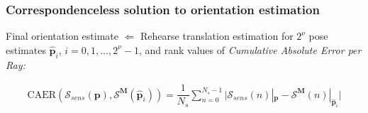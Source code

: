 \begin{frame}[noframenumbering]

  \frametitle{Correspondenceless solution to orientation estimation}

  Final orientation estimate $\Leftarrow$ Rehearse translation estimation for $2^\nu$ pose estimates $\hat{\bm{p}}_i$, $i = 0,1,\dots,2^\nu-1$, and rank values of \textit{Cumulative Absolute Error per Ray:}
  \vspace{-0.5cm}

  \begin{align}
    \text{CAER}(\mathcal{S}_{sens}(\bm{p}), \mathcal{S}^{\bm{M}}(\hat{\bm{p}}_i)) = \dfrac{1}{N_s} \sum\limits_{n=0}^{N_s-1}\Bigg|\mathcal{S}_{sens}(n)|_{\bm{p}}-\mathcal{S}^{\bm{M}}(n)|_{\hat{\bm{p}}_i} \Bigg| \nonumber
  \end{align}
  \vspace{-0.5cm}

  \begin{figure}
    
  \end{figure}

\end{frame}
